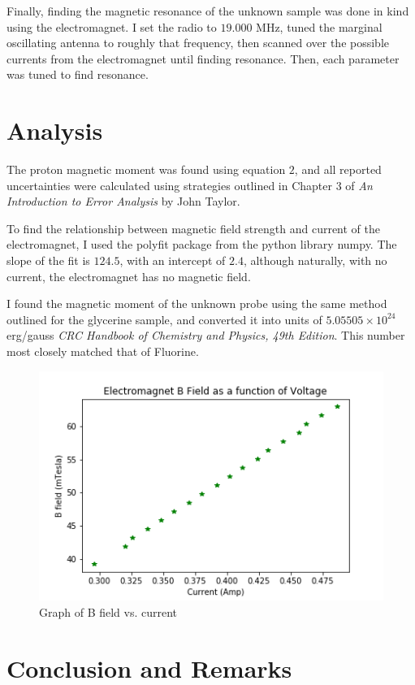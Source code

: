\documentclass[twocolumn]{article}
\begin{document}
Finally, finding the magnetic resonance of the unknown sample was done in kind using the electromagnet. I set the
radio to $19.000$ MHz, tuned the marginal oscillating antenna to roughly that frequency, then scanned over the possible
currents from the electromagnet until finding resonance. Then, each parameter was tuned to find resonance.

\section*{Analysis}

The proton magnetic moment was found using equation $2$, and all reported uncertainties were calculated
using strategies outlined in Chapter 3 of {\it An Introduction to Error Analysis} by John Taylor.

To find the relationship between magnetic field strength and current of the electromagnet, I used the polyfit package from the
python library numpy. The slope of the fit is $124.5$, with an intercept of $2.4$, although naturally, with no current,
the electromagnet has no magnetic field.

I found the magnetic moment of the unknown probe using the same method outlined for the glycerine sample,
and converted it into units of $5.05505 \times 10^{24}$ erg/gauss {\it CRC Handbook of Chemistry and Physics, 49th Edition}.
This number most closely matched that of Fluorine.

\begin{figure}
\includegraphics[width=\linewidth]{nmr_fig_1.png}
\caption{Graph of B field vs. current}
\label{fig:graph1}
\end{figure}
  \section*{Conclusion and Remarks}
\end{document}
